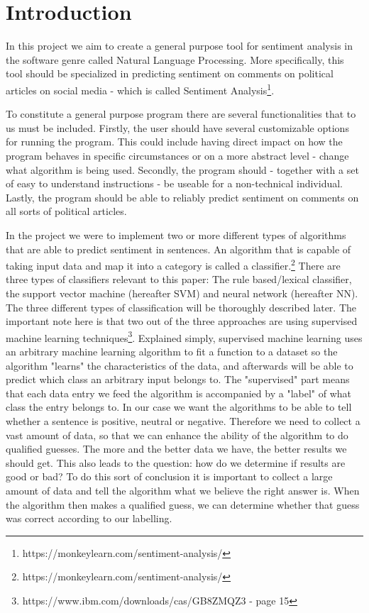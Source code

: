 \section{Introduction}
In this project we aim to create a general purpose tool for sentiment analysis in the software genre called Natural Language Processing. More specifically, this tool should be specialized in predicting sentiment on comments on political articles on social media - which is called Sentiment Analysis\footnote{https://monkeylearn.com/sentiment-analysis/}.

To constitute a general purpose program there are several functionalities that to us must be included. Firstly, the user should have several customizable options for running the program. This could include having direct impact on how the program behaves in specific circumstances or on a more abstract level - change what algorithm is being used. Secondly, the program should - together with a set of easy to understand instructions - be useable for a non-technical individual. Lastly, the program should be able to reliably predict sentiment on comments on all sorts of political articles.

In the project we were to implement two or more different types of algorithms that are able to predict sentiment in sentences. An algorithm that is capable of taking input data and map it into a category is called a classifier.\footnote{https://monkeylearn.com/sentiment-analysis/}
	There are three types of classifiers relevant to this paper: The rule based/lexical classifier, the support vector machine (hereafter SVM) and neural network (hereafter NN). The three different types of classification will be thoroughly described later. The important note here is that two out of the three approaches are using supervised machine learning techniques\footnote{https://www.ibm.com/downloads/cas/GB8ZMQZ3 - page 15}. Explained simply, supervised machine learning uses an arbitrary machine learning algorithm to fit a function to a dataset so the algorithm "learns" the characteristics of the data, and afterwards will be able to predict which class an arbitrary input belongs to. The "supervised" part means that each data entry we feed the algorithm is accompanied by a "label" of what class the entry belongs to. In our case we want the algorithms to be able to tell whether a sentence is positive, neutral or negative. Therefore we need to collect a vast amount of data, so that we can enhance the ability of the algorithm to do qualified guesses. The more and the better data we have, the better results we should get. This also leads to the question: how do we determine if results are good or bad?
	To do this sort of conclusion it is important to collect a large amount of data and tell the algorithm what we believe the right answer is. When the algorithm then makes a qualified guess, we can determine whether that guess was correct according to our labelling. 

